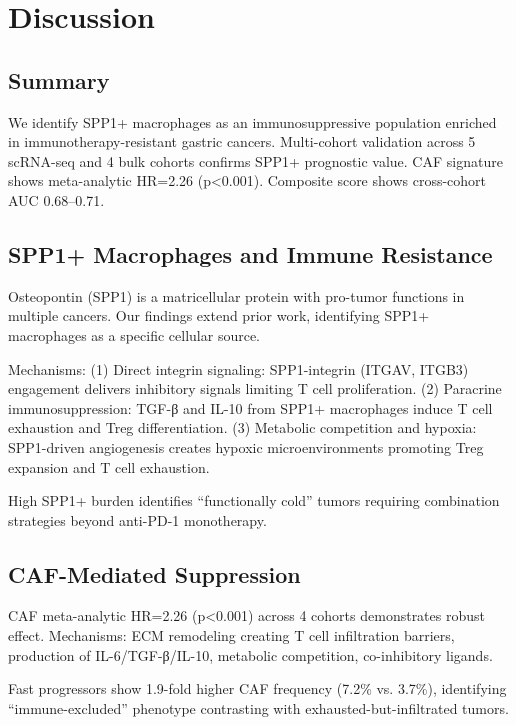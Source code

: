 \documentclass[12pt,twoside]{article}
\begin{document}
\section{Discussion}

\subsection{Summary}

We identify SPP1+ macrophages as an immunosuppressive population enriched in immunotherapy-resistant gastric cancers. Multi-cohort validation across 5 scRNA-seq and 4 bulk cohorts confirms SPP1+ prognostic value. CAF signature shows meta-analytic HR=2.26 (p<0.001). Composite score shows cross-cohort AUC 0.68--0.71.

\subsection{SPP1+ Macrophages and Immune Resistance}

Osteopontin (SPP1) is a matricellular protein with pro-tumor functions in multiple cancers. Our findings extend prior work, identifying SPP1+ macrophages as a specific cellular source.

Mechanisms: (1) Direct integrin signaling: SPP1-integrin (ITGAV, ITGB3) engagement delivers inhibitory signals limiting T cell proliferation. (2) Paracrine immunosuppression: TGF-β and IL-10 from SPP1+ macrophages induce T cell exhaustion and Treg differentiation. (3) Metabolic competition and hypoxia: SPP1-driven angiogenesis creates hypoxic microenvironments promoting Treg expansion and T cell exhaustion.

High SPP1+ burden identifies ``functionally cold'' tumors requiring combination strategies beyond anti-PD-1 monotherapy.

\subsection{CAF-Mediated Suppression}

CAF meta-analytic HR=2.26 (p<0.001) across 4 cohorts demonstrates robust effect. Mechanisms: ECM remodeling creating T cell infiltration barriers, production of IL-6/TGF-β/IL-10, metabolic competition, co-inhibitory ligands.

Fast progressors show 1.9-fold higher CAF frequency (7.2\% vs. 3.7\%), identifying ``immune-excluded'' phenotype contrasting with exhausted-but-infiltrated tumors.
\end{document}
